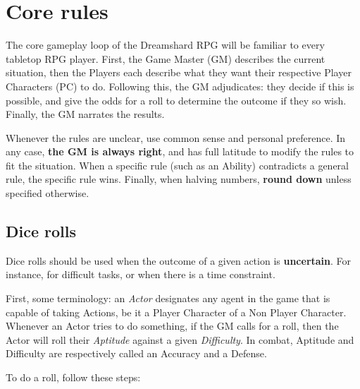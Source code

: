 \chapter{Core rules}

The core gameplay loop of the Dreamshard RPG will be familiar to every tabletop RPG player. First, the Game Master (GM) describes the current situation, then the Players each describe what they want their respective Player Characters (PC) to do. Following this, the GM adjudicates: they decide if this is possible, and give the odds for a roll to determine the outcome if they so wish. Finally, the GM narrates the results. 

Whenever the rules are unclear, use common sense and personal preference. In any case, \textbf{the GM is always right}, and has full latitude to modify the rules to fit the situation. When a specific rule (such as an Ability) contradicts a general rule, the specific rule wins. Finally, when halving numbers, \textbf{round down} unless specified otherwise. 


\section{Dice rolls}
\label{dice_rolls}

Dice rolls should be used when the outcome of a given action is \textbf{uncertain}. For instance, for difficult tasks, or when there is a time constraint.

First, some terminology: an \textit{Actor} designates any agent in the game that is capable of taking Actions, be it a Player Character of a Non Player Character. Whenever an Actor tries to do something, if the GM calls for a roll, then the Actor will roll their \textit{Aptitude} against a given \textit{Difficulty}. In combat, Aptitude and Difficulty are respectively called an Accuracy and a Defense.

To do a roll, follow these steps:

